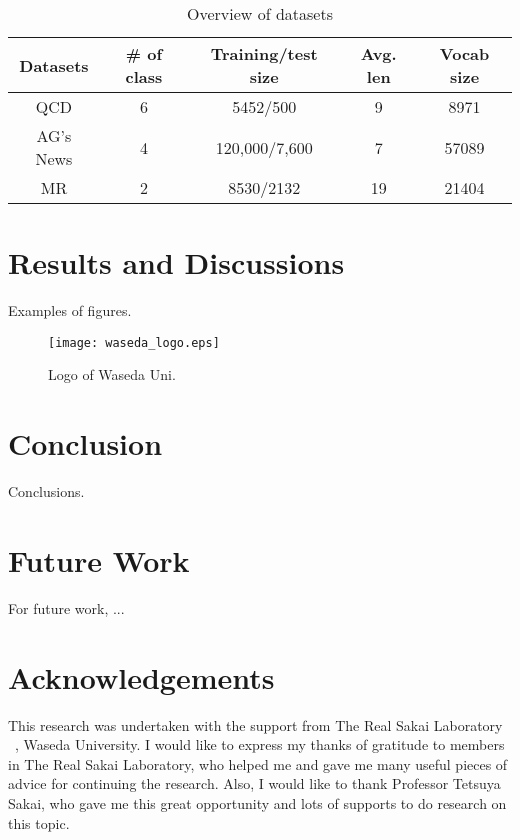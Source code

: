\documentclass[12pt]{jsbook}
\begin{document}
\begin{table}[H]
  \begin{center}
    \caption{Overview of datasets}
    \begin{tabular}{c|c|c|c|c} \hline
      Datasets & \# of class & Training/test size & Avg. len & Vocab size\\ \hline
      QCD & 6 & 5452/500 & 9 & 8971\\
      AG's News & 4 & 120,000/7,600 & 7 & 57089\\
      MR & 2 & 8530/2132 & 19 & 21404\\ \hline
    \end{tabular}
  \end{center}
\end{table}

\chapter{\rmfamily Results and Discussions} %
\label{sec:results_and_discussions}

Examples of figures.

\begin{figure}[H]
  \centering
  \caption{Logo of Waseda Uni.}
  \texttt{[image: waseda\_logo.eps]}
\end{figure}

\chapter{\rmfamily Conclusion} %
\label{sec:conclusion}

Conclusions.

\chapter{\rmfamily Future Work}

For future work, ...

\chapter*{\rmfamily Acknowledgements} %
\label{sec:acknowledgements}

This research was undertaken with the support from The Real Sakai Laboratory ~\cite{RSL}, Waseda University. I would like to express my thanks of gratitude to members in The Real Sakai Laboratory, who helped me and gave me many useful pieces of advice for continuing the research. Also, I would like to thank Professor Tetsuya Sakai, who gave me this great opportunity and lots of supports to do research on this topic.

\newpage




\newpage
\end{document}
